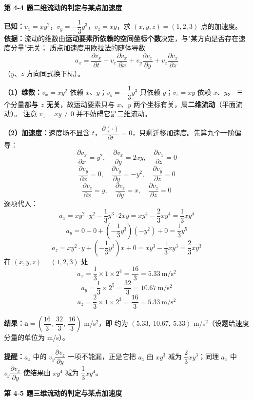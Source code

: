 \noindent\textbf{第 4-4 题\quad 二维流动的判定与某点加速度}

\begin{jie}
\textbf{已知：}$v_x=xy^2$，$v_y=-\dfrac{1}{3}y^3$，$v_z=xy$，求 $(x,y,z)=(1,2,3)$ 点的加速度。
\textbf{依据：}流动的维数由\textbf{运动要素所依赖的空间坐标个数}决定，与"某方向是否存在速度分量"无关；
质点加速度用欧拉法的随体导数
\[ a_x=\frac{\partial v_x}{\partial t}+v_x\frac{\partial v_x}{\partial x}+v_y\frac{\partial v_x}{\partial y}+v_z\frac{\partial v_x}{\partial z} \]
（$y$、$z$ 方向同式换下标）。

\textbf{（1）维数：}$v_x=xy^2$ 依赖 $x$、$y$；$v_y=-\dfrac{1}{3}y^3$ 只依赖 $y$；$v_z=xy$ 依赖 $x$、$y$。
三个分量都\textbf{与 $z$ 无关}，故运动要素只与 $x$、$y$ 两个坐标有关，属\textbf{二维流动}（平面流动）。
注意 $v_z=xy\neq0$ 并不妨碍它是二维流动。

\textbf{（2）加速度：}速度场不显含 $t$，$\dfrac{\partial(\cdot)}{\partial t}=0$，只剩迁移加速度。先算九个一阶偏导：
\[ \frac{\partial v_x}{\partial x}=y^2,\quad\frac{\partial v_x}{\partial y}=2xy,\quad\frac{\partial v_x}{\partial z}=0 \]
\[ \frac{\partial v_y}{\partial x}=0,\quad\frac{\partial v_y}{\partial y}=-y^2,\quad\frac{\partial v_y}{\partial z}=0 \]
\[ \frac{\partial v_z}{\partial x}=y,\quad\frac{\partial v_z}{\partial y}=x,\quad\frac{\partial v_z}{\partial z}=0 \]
逐项代入：
\[ a_x=xy^2\cdot y^2-\frac{1}{3}y^3\cdot2xy=xy^4-\frac{2}{3}xy^4=\frac{1}{3}xy^4 \]
\[ a_y=0+0+\left(-\frac{1}{3}y^3\right)\left(-y^2\right)+0=\frac{1}{3}y^5 \]
\[ a_z=xy^2\cdot y+\left(-\frac{1}{3}y^3\right)x+0=xy^3-\frac{1}{3}xy^3=\frac{2}{3}xy^3 \]
在 $(x,y,z)=(1,2,3)$ 处
\[ a_x=\frac{1}{3}\times1\times2^4=\frac{16}{3}=5.33\ \mathrm{m/s^2} \]
\[ a_y=\frac{1}{3}\times2^5=\frac{32}{3}=10.67\ \mathrm{m/s^2} \]
\[ a_z=\frac{2}{3}\times1\times2^3=\frac{16}{3}=5.33\ \mathrm{m/s^2} \]

\textbf{结果：}$\bm{a}=\left(\dfrac{16}{3},\ \dfrac{32}{3},\ \dfrac{16}{3}\right)$ m/s$^2$，即
约为 $(5.33,\ 10.67,\ 5.33)$ m/s$^2$（设题给速度分量的单位为 m/s）。

\textbf{提醒：}$a_z$ 中的 $v_y\dfrac{\partial v_z}{\partial y}$ 一项不能漏，正是它把 $a_z$ 由 $xy^3$ 减为
$\dfrac{2}{3}xy^3$；同理 $a_x$ 中 $v_y\dfrac{\partial v_x}{\partial y}$ 使结果由 $xy^4$ 减为 $\dfrac{1}{3}xy^4$。
\end{jie}

\noindent\textbf{第 4-5 题\quad 三维流动的判定与某点加速度}

